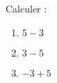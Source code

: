 
\begin{mental}
    Calculer :
    \begin{enumerate}
        \item
            \( 5-3\)
        \item
            \( 3-5\)
        \item
            \( -3+5\)
    \end{enumerate}
\end{mental}
